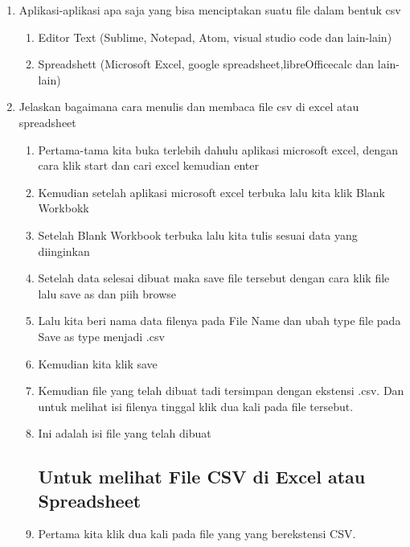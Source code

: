 \documentclass[a4paper, 12pt]{article}
\begin{document}
\begin{enumerate}
\item Aplikasi-aplikasi apa saja yang bisa menciptakan suatu file dalam bentuk csv
\begin{enumerate}
\item Editor Text (Sublime, Notepad, Atom, visual studio code dan lain-lain) 
\item Spreadshett (Microsoft Excel, google spreadsheet,libreOfficecalc dan lain-lain)
\end{enumerate}
\item Jelaskan bagaimana cara menulis dan membaca file csv di excel atau spreadsheet
\begin{enumerate}
\subsection{Menulis File CSV}
\item Pertama-tama kita buka terlebih dahulu aplikasi microsoft excel, dengan cara klik start dan cari excel kemudian enter
\item Kemudian setelah aplikasi microsoft excel terbuka lalu kita klik Blank Workbokk

\item Setelah Blank Workbook terbuka lalu kita tulis sesuai data yang diinginkan 
 
\item Setelah data selesai dibuat maka save file tersebut dengan cara klik file lalu save as dan piih browse
 
\item Lalu kita beri nama data filenya pada File Name dan ubah type file pada Save as type menjadi .csv
 
\item Kemudian kita klik save
 
\item Kemudian file yang telah dibuat tadi tersimpan dengan ekstensi .csv. Dan untuk melihat isi filenya tinggal klik dua kali pada file tersebut.

\item Ini adalah isi file yang telah dibuat

\subsection{Untuk melihat File CSV di Excel atau Spreadsheet}
\item Pertama kita klik dua kali pada file yang yang berekstensi CSV.
	

\end{enumerate}
\end{enumerate}
\end{document}
